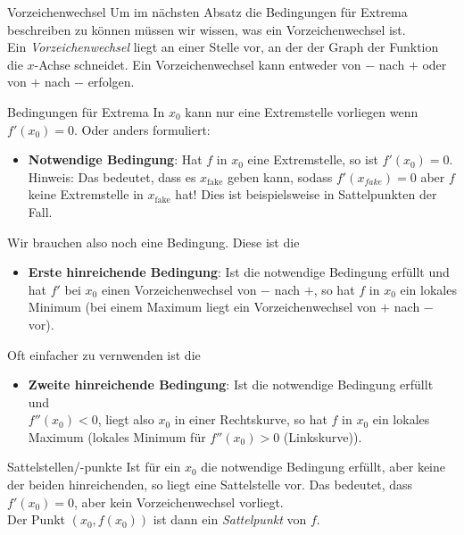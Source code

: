\begin{bla}{Vorzeichenwechsel}
  Um im nächsten Absatz die Bedingungen für Extrema beschreiben zu können müssen wir wissen, was ein Vorzeichenwechsel ist. \\ Ein \emph{Vorzeichenwechsel} liegt an einer Stelle vor, an der der Graph der Funktion die $x$-Achse schneidet. Ein Vorzeichenwechsel kann entweder von $-$ nach $+$ oder von $+$ nach $-$ erfolgen.
\end{bla}

\begin{bla}{Bedingungen für Extrema}
  In $x_0$ kann nur eine Extremstelle vorliegen wenn $f'(x_0)=0$. Oder anders formuliert:
  \begin{itemize}
    \item \textbf{Notwendige Bedingung}: Hat $f$ in $x_0$ eine Extremstelle, so ist $f'(x_0)=0$. \\
    Hinweis: Das bedeutet, dass es $x_{\text{fake}}$ geben kann, sodass $f'(x_{fake})=0$ aber $f$ keine Extremstelle in $x_{\text{fake}}$ hat! Dies ist beispielsweise in Sattelpunkten der Fall.
  \end{itemize}
  Wir brauchen also noch eine Bedingung. Diese ist die
  \begin{itemize}
    \item \textbf{Erste hinreichende Bedingung}: Ist die notwendige Bedingung erfüllt und hat $f'$ bei $x_0$ einen Vorzeichenwechsel von $-$ nach $+$, so hat $f$ in $x_0$ ein lokales Minimum (bei einem Maximum liegt ein Vorzeichenwechsel von $+$ nach $-$ vor).
  \end{itemize}
  Oft einfacher zu vernwenden ist die
  \begin{itemize}
    \item \textbf{Zweite hinreichende Bedingung}: Ist die notwendige Bedingung erfüllt und \\ $f''(x_0)<0$, liegt also $x_0$ in einer Rechtskurve, so hat $f$ in $x_0$ ein lokales Maximum (lokales Minimum für $f''(x_0)>0$ (Linkskurve)).
  \end{itemize}
\end{bla}

\begin{bla}{Sattelstellen/-punkte}
  Ist für ein $x_0$ die notwendige Bedingung erfüllt, aber keine der beiden hinreichenden, so liegt eine Sattelstelle vor. Das bedeutet, dass $f'(x_0)=0$, aber kein Vorzeichenwechsel vorliegt. \\ Der Punkt $(x_0,f(x_0))$ ist dann ein \emph{Sattelpunkt} von $f$.
\end{bla}

